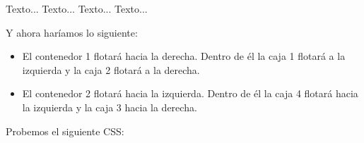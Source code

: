 \documentclass[letterpaper,10pt,spanish]{sphinxmanual}
\begin{document}
\begin{sphinxVerbatim}[commandchars=\\\{\}]
 
     
        Texto...
     
        Texto...
 
 
     
        Texto...
     
        Texto...
 
\end{sphinxVerbatim}

Y ahora haríamos lo siguiente:
\begin{itemize}
\item {} 
El contenedor 1 flotará hacia la derecha. Dentro de él la caja 1 flotará a la izquierda y la caja 2 flotará a la derecha.

\item {} 
El contenedor 2 flotará hacia la izquierda. Dentro de él la caja 4 flotará hacia la izquierda y la caja 3 hacia la derecha.

\end{itemize}

Probemos el siguiente CSS:
\end{document}
